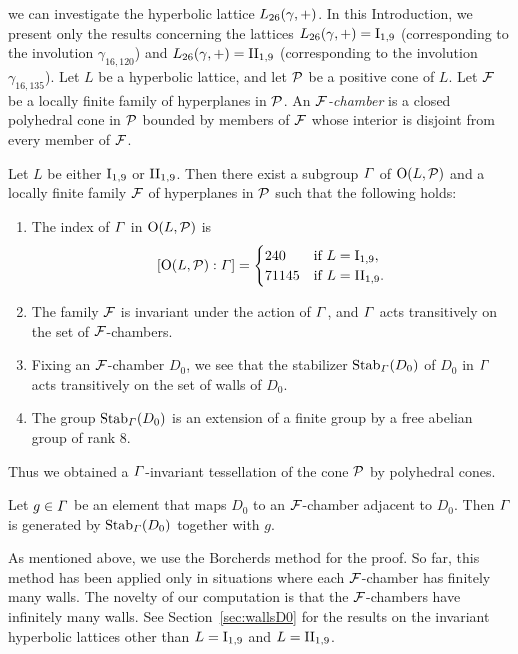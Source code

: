 \documentclass{amsart} %
\begin{document}
we can investigate %
the hyperbolic lattice $L_{26}(\gamma, +)$.
In this Introduction, 
we present only the results concerning
 the lattices $L_{26}(\gamma, +)=\mathrm{I}_{1,9}$ (corresponding to the involution $\gamma_{16,120}$) 
and $L_{26}(\gamma, +)=\mathrm{II}_{1,9}$ (corresponding to the involution $\gamma_{16,135}$).
Let $L$ be a hyperbolic lattice, 
and let $\mathord{\mathcal{P}}$ be a positive cone of $L$.
 Let $\mathord{\mathcal{F}}$ be a locally finite family of hyperplanes in $\mathord{\mathcal{P}}$. 
 An \emph{$\mathord{\mathcal{F}}$-chamber} is a closed polyhedral cone in $\mathord{\mathcal{P}}$ 
 bounded by members of $\mathord{\mathcal{F}}$ whose interior is disjoint from every member of $\mathord{\mathcal{F}}$.
%
%
\begin{theorem}\label{thm:main3}
Let $L$ be either $\mathrm{I}_{1,9}$ or $\mathrm{II}_{1,9}$. 
Then there exist a subgroup $\varGamma$ 
of $\mathord{\mathrm{O}}(L,\mathord{\mathcal{P}})$ and a locally finite family $\mathord{\mathcal{F}}$ of hyperplanes in $\mathord{\mathcal{P}}$
such that the following holds:
\begin{enumerate}[label={\rm(\roman*)}]
%
\item
The index of $\varGamma$ in $\mathord{\mathrm{O}}(L,\mathord{\mathcal{P}})$ is 
\[
[\mathord{\mathrm{O}}(L,\mathord{\mathcal{P}}): \varGamma]=\begin{cases}
240 & \textrm{if $L=\mathrm{I}_{1,9}$}, \\
71145 & \textrm{if $L=\mathrm{II}_{1,9}$}. \\
\end{cases}
\]
\item The family $\mathord{\mathcal{F}}$ is invariant under the action of $\varGamma$, 
and $\varGamma$ acts transitively on the set of $\mathord{\mathcal{F}}$-chambers.
\item Fixing an $\mathord{\mathcal{F}}$-chamber $D_0$,
we see that the stabilizer $\operatorname{Stab}_{\varGamma}(D_0)$ of $D_0$ in $\varGamma$
 acts transitively on the set of walls of $D_0$.
 \item 
 The group 
 $\operatorname{Stab}_{\varGamma}(D_0)$ is an extension of a finite group by a free abelian group of rank $8$.
\end{enumerate}
\end{theorem}
%
Thus we obtained a $\varGamma$-invariant tessellation of the cone $\mathord{\mathcal{P}}$ by polyhedral cones.
%
\begin{corollary}\label{cor:CorOfmain3}
Let $g\in\varGamma$ be an element that maps $D_0$ to an $\mathord{\mathcal{F}}$-chamber adjacent to $D_0$. 
Then $\varGamma$ is generated by $\operatorname{Stab}_{\varGamma}(D_0)$ together with $g$.
\end{corollary}
%
As mentioned above, we use the Borcherds method for the proof. 
So far, 
 this method has been applied only in situations where each $\mathord{\mathcal{F}}$-chamber has finitely many walls. 
 The novelty of our computation is that 
 the $\mathord{\mathcal{F}}$-chambers have infinitely many walls. 
See Section~\ref{sec:wallsD0} for the results on the invariant hyperbolic lattices
other than $L=\mathrm{I}_{1,9}$ and $L=\mathrm{II}_{1,9}$.
%
\end{document}
